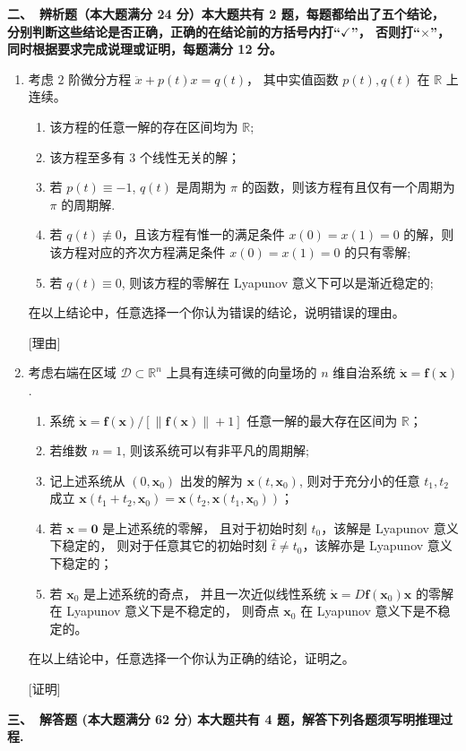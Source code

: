 \textbf{二、\ 辨析题（本大题满分 24 分）本大题共有 2 题，每题都给出了五个结论，
分别判断这些结论是否正确，正确的在结论前的方括号内打``$\checkmark$''，
否则打``$\times$''，同时根据要求完成说理或证明，每题满分 12 分。}
\begin{enumerate}
\item 考虑 $2$ 阶微分方程 $\ddot{x}+p(t) x=q(t)$，
其中实值函数 $p(t), q(t)$ 在 $\mathbb{R}$ 上连续。
\begin{enumerate}[label=$【\qquad】$]
\item 该方程的任意一解的存在区间均为 $\mathbb{R}$;
\item 该方程至多有 $3$ 个线性无关的解；
\item 若 $p(t) \equiv-1$, $q(t)$ 是周期为 $\pi$ 的函数，则该方程有且仅有一个周期为 $\pi$ 的周期解.
\item 若 $q(t) \not \equiv 0$，且该方程有惟一的满足条件 $x(0)=x(1)=0$ 的解，则该方程对应的齐次方程满足条件 $x(0)=x(1)=0$ 的只有零解;
\item 若 $q(t) \equiv 0$, 则该方程的零解在 Lyapunov 意义下可以是渐近稳定的;
\end{enumerate}
在以上结论中，任意选择一个你认为错误的结论，说明错误的理由。

[理由]

\item 考虑右端在区域 $\mathcal{D} \subset \mathbb{R}^{n}$ 上具有连续可微的向量场的 $n$ 维自治系统 $\dot{\boldsymbol{x}}=\boldsymbol{f}(\boldsymbol{x})$.
\begin{enumerate}[label=$【\qquad】$]
\item 系统 $\dot{\boldsymbol{x}}=\boldsymbol{f}(\boldsymbol{x}) /[\|\boldsymbol{f}(\boldsymbol{x})\|+1]$ 任意一解的最大存在区间为 $\mathbb{R}$；
\item 若维数 $n=1$, 则该系统可以有非平凡的周期解;
\item 记上述系统从 $(0, \boldsymbol{x}_{0})$ 出发的解为 $\boldsymbol{x}(t, \boldsymbol{x}_{0})$, 
则对于充分小的任意 $t_{1}, t_{2}$ 成立 $\boldsymbol{x}(t_{1}+t_{2}, \boldsymbol{x}_{0})=\boldsymbol{x}(t_{2}, \boldsymbol{x}(t_{1}, \boldsymbol{x}_{0}))$；
\item 若 $\boldsymbol{x}=\mathbf{0}$ 是上述系统的零解，
且对于初始时刻 $t_{0}$，该解是 Lyapunov 意义下稳定的，
则对于任意其它的初始时刻 $\hat{t} \neq t_{0}$，该解亦是 Lyapunov 意义下稳定的；
\item 若 $\boldsymbol{x}_{0}$ 是上述系统的奇点，
并且一次近似线性系统 $\dot{\boldsymbol{x}}=D \boldsymbol{f}(\boldsymbol{x}_{0}) \boldsymbol{x}$ 的零解在 Lyapunov 意义下是不稳定的，
则奇点 $\boldsymbol{x}_{0}$ 在 Lyapunov 意义下是不稳定的。
\end{enumerate}
在以上结论中，任意选择一个你认为正确的结论，证明之。

[证明]
\end{enumerate}
\textbf{三、\ 解答题 (本大题满分 62 分) 本大题共有 4 题，解答下列各题须写明推理过程.}

